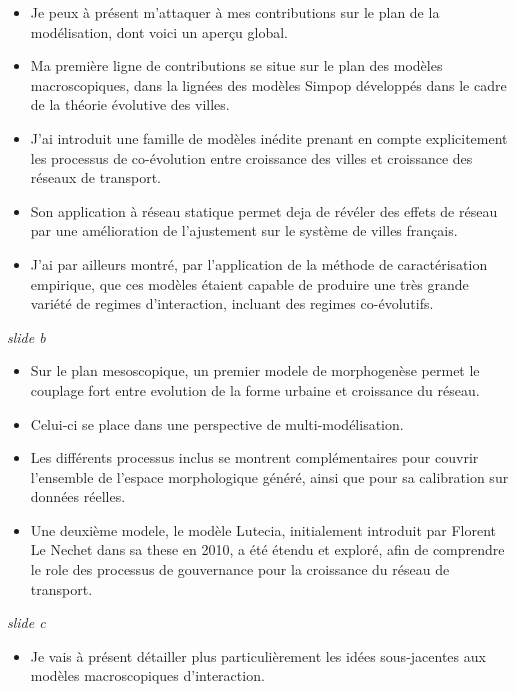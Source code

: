 \documentclass[12pt]{article}
\begin{document}
\begin{itemize}
	\item Je peux à présent m'attaquer à mes contributions sur le plan de la modélisation, dont voici un aperçu global.
	\item Ma première ligne de contributions se situe sur le plan des modèles macroscopiques, dans la lignées des modèles Simpop développés dans le cadre de la théorie évolutive des villes.
	\item J'ai introduit une famille de modèles inédite prenant en compte explicitement les processus de co-évolution entre croissance des villes et croissance des réseaux de transport.
	\item Son application à réseau statique permet deja de révéler des effets de réseau par une amélioration de l'ajustement sur le système de villes français.
	\item J'ai par ailleurs montré, par l'application de la méthode de caractérisation empirique, que ces modèles étaient capable de produire une très grande variété de regimes d'interaction, incluant des regimes co-évolutifs.
\end{itemize}



\textit{slide b}

\begin{itemize}
	\item Sur le plan mesoscopique, un premier modele de morphogenèse permet le couplage fort entre evolution de la forme urbaine et croissance du réseau.
	\item Celui-ci se place dans une perspective de multi-modélisation.
	\item Les différents processus inclus se montrent complémentaires pour couvrir l'ensemble de l'espace morphologique généré, ainsi que pour sa calibration sur données réelles.
	\item Une deuxième modele, le modèle Lutecia, initialement introduit par Florent Le Nechet dans sa these en 2010, a été étendu et exploré, afin de comprendre le role des processus de gouvernance pour la croissance du réseau de transport.
\end{itemize}

\textit{slide c}

\begin{itemize}
	\item Je vais à présent détailler plus particulièrement les idées sous-jacentes aux modèles macroscopiques d'interaction.
\end{itemize}
\end{document}
